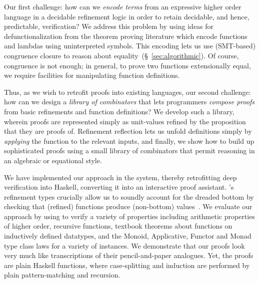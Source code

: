 %
Our first challenge: how can we \emph{encode terms}
from an expressive higher order language in a decidable
refinement logic in order to retain decidable, and hence,
predictable, verification?
%
We address this problem by using ideas for defunctionalization
from the theorem proving literature which
encode functions and lambdas using uninterpreted symbols.
This encoding lets us use (SMT-based) congruence closure to
reason about equality~(\S~\ref{sec:algorithmic}).
%
Of course, congruence is not enough; in general, \eg to prove
two functions extensionally equal, we require facilities for
manipulating function definitions.

%
Thus, as we wish to retrofit proofs into
existing languages, our second challenge:
how can we design a \emph{library of combinators}
that lets programmers \emph{compose proofs}
from basic refinements and function definitions?
%
We develop such a library, wherein proofs
are represented simply as unit-values
refined by the proposition that they
are proofs of. %
%
Refinement reflection lets us unfold definitions
simply by \emph{applying} the function to the
relevant inputs, and finally, we show how to
build up sophisticated proofs using a small
library of combinators that permit reasoning
in an algebraic or equational style.

%
We have implemented our approach in the \toolname
system, thereby retrofitting deep verification into
Haskell, converting it into an interactive proof
assistant.
%
\toolname's refinement types crucially allow us to
soundly account for the dreaded bottom by checking
that (refined) functions produce (non-bottom)
values~\cite{Vazou14}.
%
We evaluate our approach by using \toolname to
verify a variety of properties including arithmetic
properties of higher order, recursive functions,
textbook theorems about functions on inductively
defined datatypes, and the Monoid, Applicative,
Functor and Monad type class laws for a variety
of instances. %
%
We demonstrate that our proofs look very much like
transcriptions of their pencil-and-paper analogues.
Yet, the proofs are plain Haskell functions, where
case-splitting and induction are performed by
plain pattern-matching and recursion.


